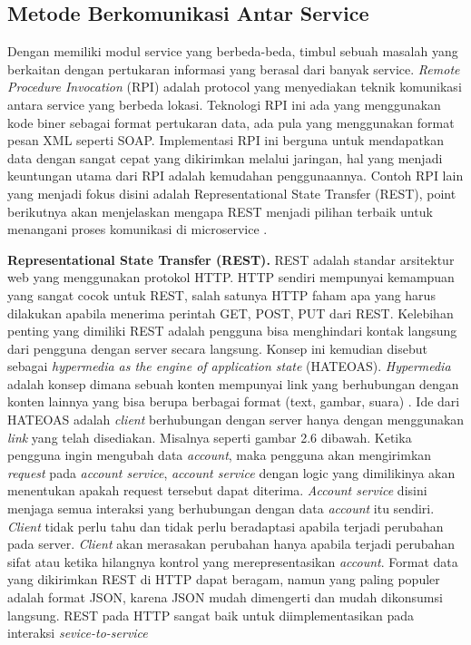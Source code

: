 \subsection{Metode Berkomunikasi Antar Service}
Dengan memiliki modul service yang berbeda-beda, timbul sebuah masalah yang berkaitan dengan pertukaran informasi yang berasal dari banyak service. \textit{Remote Procedure Invocation} (RPI) adalah protocol yang menyediakan teknik komunikasi antara service yang berbeda lokasi. Teknologi RPI ini ada yang menggunakan kode biner sebagai format pertukaran data, ada pula yang menggunakan format pesan XML seperti SOAP. Implementasi RPI ini berguna untuk mendapatkan data dengan sangat cepat yang dikirimkan melalui jaringan, hal yang menjadi keuntungan utama dari RPI adalah kemudahan penggunaannya. Contoh RPI lain yang menjadi fokus disini adalah Representational State Transfer (REST), point berikutnya akan menjelaskan mengapa REST menjadi pilihan terbaik untuk menangani proses komunikasi di microservice \cite{9}.

\textbf{Representational State Transfer (REST).} REST adalah standar arsitektur web yang menggunakan protokol HTTP. HTTP sendiri mempunyai kemampuan yang sangat cocok untuk REST, salah satunya HTTP faham apa yang harus dilakukan apabila menerima perintah GET, POST, PUT dari REST. Kelebihan penting yang dimiliki REST adalah pengguna bisa menghindari kontak langsung dari pengguna dengan server secara langsung. Konsep ini kemudian disebut sebagai \textit{hypermedia as the engine of application state} (HATEOAS). \textit{Hypermedia} adalah konsep dimana sebuah konten mempunyai link yang berhubungan dengan konten lainnya yang bisa berupa berbagai format (text, gambar, suara) \cite{9}. Ide dari HATEOAS adalah \textit{client} berhubungan dengan server hanya dengan menggunakan \textit{link} yang telah disediakan. 
Misalnya seperti gambar 2.6 dibawah. Ketika pengguna ingin mengubah data \textit{account}, maka pengguna akan mengirimkan \textit{request} pada \textit{account service}, \textit{account service} dengan logic yang dimilikinya akan menentukan apakah request tersebut dapat diterima. \textit{Account service} disini menjaga semua interaksi yang berhubungan dengan data \textit{account} itu sendiri. \textit{Client} tidak perlu tahu dan tidak perlu beradaptasi apabila terjadi perubahan pada server. \textit{Client} akan merasakan perubahan hanya apabila terjadi perubahan sifat atau ketika hilangnya kontrol yang merepresentasikan \textit{account}. Format data yang dikirimkan REST di HTTP dapat beragam, namun yang paling populer adalah format JSON, karena JSON mudah dimengerti dan mudah dikonsumsi langsung. REST pada HTTP sangat baik untuk diimplementasikan pada interaksi \textit{sevice-to-service} \cite{9}\\

